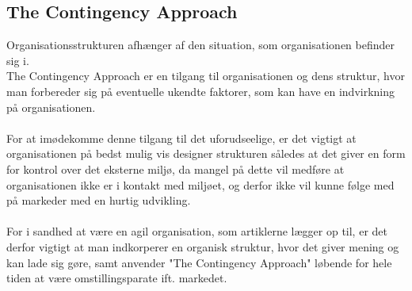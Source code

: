 \subsection{The Contingency Approach}
Organisationsstrukturen afhænger af den situation, som organisationen befinder sig i.
\\The Contingency Approach er en tilgang til organisationen og dens struktur, hvor man forbereder sig på eventuelle ukendte faktorer, som kan have en indvirkning på organisationen.
\\~\\For at imødekomme denne tilgang til det uforudseelige, er det vigtigt at organisationen på bedst mulig vis designer strukturen således at det giver en form for kontrol over det eksterne miljø,
da mangel på dette vil medføre at organisationen ikke er i kontakt med miljøet, og derfor ikke vil kunne følge med på markeder med en hurtig udvikling.
\\~\\For i sandhed at være en agil organisation, som artiklerne lægger op til, er det derfor vigtigt at man indkorperer en organisk struktur, hvor det giver mening og kan lade sig gøre, samt anvender "The Contingency Approach" løbende for hele tiden at være omstillingsparate ift. markedet.